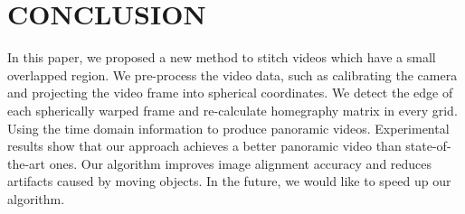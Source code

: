 \documentclass[conference]{IEEEtran}
\begin{document}
\section{CONCLUSION}
\label{sec:conclusion}

In this paper, we proposed a new method to stitch videos which have a small overlapped region. We pre-process the video data, such as calibrating the camera and projecting the video frame into spherical
coordinates. We detect the edge of each spherically warped frame and re-calculate homegraphy matrix in every grid. Using the time domain information to produce panoramic videos. 
Experimental results show that our approach achieves a better panoramic video than state-of-the-art ones. Our algorithm improves image alignment accuracy and reduces artifacts caused by
moving objects. In the future, we would like to speed up our algorithm.
\end{document}
